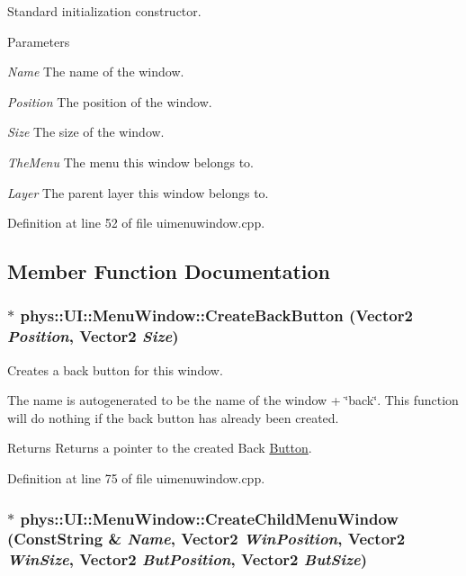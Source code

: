 Standard initialization constructor. 


\begin{DoxyParams}{Parameters}
\item[{\em Name}]The name of the window. \item[{\em Position}]The position of the window. \item[{\em Size}]The size of the window. \item[{\em TheMenu}]The menu this window belongs to. \item[{\em Layer}]The parent layer this window belongs to. \end{DoxyParams}


Definition at line 52 of file uimenuwindow.cpp.



\subsection{Member Function Documentation}
\hypertarget{classphys_1_1UI_1_1MenuWindow_a843089ce4d442eab82baef23b1121f0d}{
\subsubsection[{CreateBackButton}]{ $\ast$ phys::UI::MenuWindow::CreateBackButton ({\bf Vector2} {\em Position}, \/  {\bf Vector2} {\em Size})}}
\label{d4/d07/classphys_1_1UI_1_1MenuWindow_a843089ce4d442eab82baef23b1121f0d}


Creates a back button for this window. 

The name is autogenerated to be the name of the window + \char`\"{}back\char`\"{}. This function will do nothing if the back button has already been created. \begin{DoxyReturn}{Returns}
Returns a pointer to the created Back \hyperlink{classphys_1_1UI_1_1Button}{Button}. 
\end{DoxyReturn}


Definition at line 75 of file uimenuwindow.cpp.

\hypertarget{classphys_1_1UI_1_1MenuWindow_ae395d4158bfd4aeb874657a90367683a}{
\subsubsection[{CreateChildMenuWindow}]{ $\ast$ phys::UI::MenuWindow::CreateChildMenuWindow ({\bf ConstString} \& {\em Name}, \/  {\bf Vector2} {\em WinPosition}, \/  {\bf Vector2} {\em WinSize}, \/  {\bf Vector2} {\em ButPosition}, \/  {\bf Vector2} {\em ButSize})}}
\label{d4/d07/classphys_1_1UI_1_1MenuWindow_ae395d4158bfd4aeb874657a90367683a}


